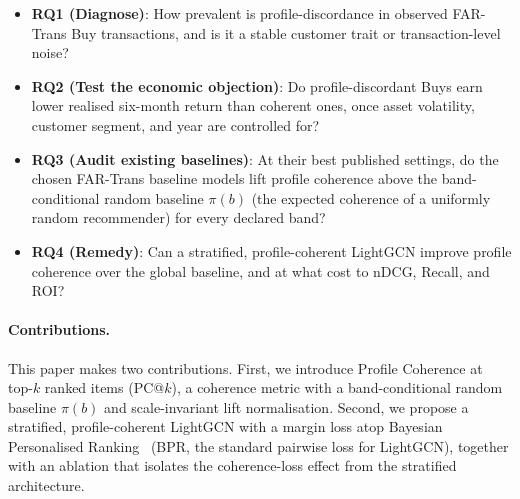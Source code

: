 \begin{itemize}
    \item \textbf{RQ1 (Diagnose)}: How prevalent is profile-discordance in observed FAR-Trans Buy transactions, and is it a stable customer trait or transaction-level noise?
    \item \textbf{RQ2 (Test the economic objection)}: Do profile-discordant Buys earn lower realised six-month return than coherent ones, once asset volatility, customer segment, and year are controlled for?
    \item \textbf{RQ3 (Audit existing baselines)}: At their best published settings, do the chosen FAR-Trans baseline models lift profile coherence above the band-conditional random baseline $\pi(b)$ (the expected coherence of a uniformly random recommender) for every declared band?
    \item \textbf{RQ4 (Remedy)}: Can a stratified, profile-coherent LightGCN improve profile coherence over the global baseline, and at what cost to nDCG, Recall, and ROI?
\end{itemize}

\paragraph{Contributions.} This paper makes two contributions. First, we introduce Profile Coherence at top-$k$ ranked items (PC@$k$), a coherence metric with a band-conditional random baseline $\pi(b)$ and scale-invariant lift normalisation. Second, we propose a stratified, profile-coherent LightGCN with a margin loss atop Bayesian Personalised Ranking~\cite{rendle2012bprbayesianpersonalizedranking} (BPR, the standard pairwise loss for LightGCN), together with an ablation that isolates the coherence-loss effect from the stratified architecture.
